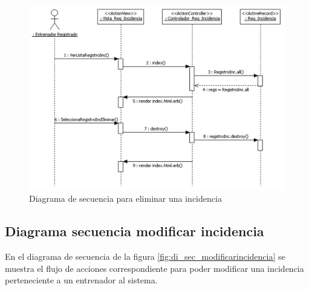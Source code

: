 		  \begin{figure}[H]
			  \centering
			    \includegraphics[width=15cm]{./eps/di_diagsecuencia/RegistroInc_Eliminar.eps}
			  \caption{Diagrama de secuencia para eliminar una incidencia}
			  \label{fig:di_sec_eliminarincidencia}
			\end{figure}
			
			\newpage
		
		\subsection{Diagrama secuencia modificar incidencia} %
		  \label{sub:diagrama_secuencia_modificar_incidencia}
		
		  En el diagrama de secuencia de la figura \ref{fig:di_sec_modificarincidencia} se muestra el flujo de acciones correspondiente para poder modificar una incidencia perteneciente a un entrenador al sistema.
		  
